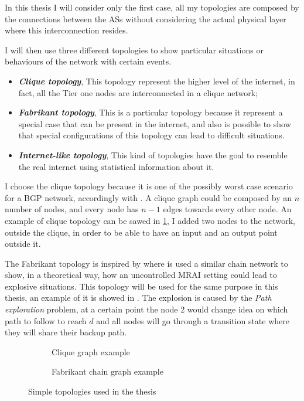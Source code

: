 In this thesis I will consider only the first case, all my topologies are composed by
the connections between the \acp{AS} without considering the actual physical layer
where this interconnection resides.

I will then use three different topologies to show particular situations or 
behaviours of the network with certain events.
\begin{itemize}
	\item \textbf{\textit{Clique topology}}, This topology represent the higher
		level of the internet, in fact, all the Tier one nodes are interconnected
		in a clique network;
	\item \textbf{\textit{Fabrikant topology}}, This is a particular topology
		because it represent a special case that can be present in the internet,
		and also is possible to show that special configurations of this topology
		can lead to difficult situations.
	\item \textbf{\textit{Internet-like topology}}, This kind of topologies
		have the goal to resemble the real internet using statistical information
		about it.
\end{itemize}

I choose the clique topology because it is one of the possibly worst
case scenario for a \ac{BGP} network, accordingly with \cite{labovitz2000delayed}.
A clique graph could be composed by an $n$ number of nodes, and every node has
$n-1$ edges towards every other node.
An example of clique topology can be sawed in \cref{fig:clique_topology}, I added
two nodes to the network, outside the clique, in order to be able to have an
input and an output point outside it.

The Fabrikant topology is inspired by \cite{fabrikant2011there} where is used
a similar chain network to show, in a theoretical way, how an uncontrolled
\ac{MRAI} setting could lead to explosive situations.
This topology will be used for the same purpose in this thesis, an example
of it is showed in .
The explosion is caused by the \textit{Path exploration} problem, at a certain
point the node \num{2} would change idea on which path to follow to reach $d$
and all nodes will go through a transition state where they will 
share their backup path.

\begin{figure}[ht]
     \centering
     \begin{subfigure}[b]{0.45\textwidth}
         \centering
		 
		 \caption{Clique graph example}
    	 \label{fig:clique_topology}
     \end{subfigure}
     \hfill
     \begin{subfigure}[b]{0.45\textwidth}
         \centering
         
		 \caption{Fabrikant chain graph example}
		 \label{fig:fabrikant_topology}
     \end{subfigure}
		\caption{Simple topologies used in the thesis}
        \label{fig:clique_and_fabrikant}
\end{figure}

